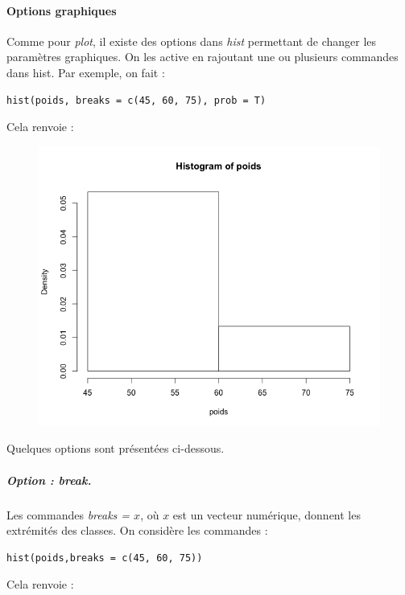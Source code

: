 \paragraph{Options graphiques}
Comme pour \textit{plot}, il existe des options dans \textit{hist} permettant de changer les paramètres graphiques. On les active en rajoutant une ou plusieurs commandes dans hist. \newline
Par exemple, on fait :
\begin{lstlisting}[language=html]
hist(poids, breaks = c(45, 60, 75), prob = T)
\end{lstlisting}
Cela renvoie :
\begin{figure}[H]\begin{center}\includegraphics[scale=0.4]{ilu/gra44.png}\end{center}\end{figure}
Quelques options sont présentées ci-dessous.
\subparagraph{Option : break.}
Les commandes \textit{breaks = $x$}, où $x$ est un vecteur numérique, donnent les extrémités des classes.\newline
On considère les commandes :
\begin{lstlisting}[language=html]
hist(poids,breaks = c(45, 60, 75))
\end{lstlisting}
Cela renvoie :
